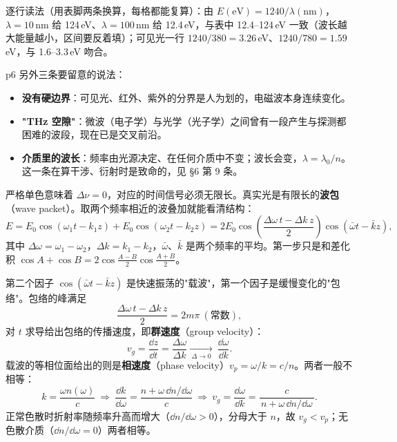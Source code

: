 \documentclass[10pt]{ctexart}
\begin{document}
逐行读法（用表脚两条换算，每格都能复算）：由 $E(\text{eV})=1240/\lambda(\text{nm})$，$\lambda=10$\,nm 给 124\,eV、$\lambda=100$\,nm 给 12.4\,eV，与表中 12.4--124\,eV 一致（波长越大能量越小，区间要反着填）；可见光一行 $1240/380=3.26$\,eV、$1240/780=1.59$\,eV，与 1.6--3.3\,eV 吻合。


p6 另外三条要留意的说法：
\begin{itemize}
\item \textbf{没有硬边界}：可见光、红外、紫外的分界是人为划的，电磁波本身连续变化。
\item \textbf{"THz 空隙"}：微波（电子学）与光学（光子学）之间曾有一段产生与探测都困难的波段，现在已是交叉前沿。
\item \textbf{介质里的波长}：频率由光源决定、在任何介质中不变；波长会变，$\lambda=\lambda_0/n$。这一条在算干涉、衍射时是致命的，见 §6 第 9 条。
\end{itemize}



严格单色意味着 $\Delta\nu=0$，对应的时间信号必须无限长。真实光是有限长的\textbf{波包}（wave packet）。取两个频率相近的波叠加就能看清结构：
\[
E=E_0\cos(\omega_1t-k_1z)+E_0\cos(\omega_2t-k_2z)
=2E_0\cos\!\left(\frac{\Delta\omega\,t-\Delta k\,z}{2}\right)\cos(\bar\omega t-\bar k z),
\]
其中 $\Delta\omega=\omega_1-\omega_2$，$\Delta k=k_1-k_2$，$\bar\omega$、$\bar k$ 是两个频率的平均。第一步只是和差化积 $\cos A+\cos B=2\cos\frac{A-B}{2}\cos\frac{A+B}{2}$。

第二个因子 $\cos(\bar\omega t-\bar kz)$ 是快速振荡的"载波"，第一个因子是缓慢变化的"包络"。包络的峰满足
\[
\frac{\Delta\omega\,t-\Delta k\,z}{2}=2m\pi\ (\text{常数}),
\]
对 $t$ 求导给出包络的传播速度，即\textbf{群速度}（group velocity）：
\[
v_g=\frac{\dd z}{\dd t}=\frac{\Delta\omega}{\Delta k}
\xrightarrow[\ \Delta\to0\ ]{}\ \frac{\dd\omega}{\dd k}.
\]
载波的等相位面给出的则是\textbf{相速度}（phase velocity）$v_p=\omega/k=c/n$。两者一般不相等：
\[
k=\frac{\omega n(\omega)}{c}
\ \Longrightarrow\
\frac{\dd k}{\dd\omega}=\frac{n+\omega\,\dd n/\dd\omega}{c}
\ \Longrightarrow\
v_g=\frac{\dd\omega}{\dd k}=\frac{c}{\,n+\omega\,\dd n/\dd\omega\,}.
\]
正常色散时折射率随频率升高而增大（$\dd n/\dd\omega>0$），分母大于 $n$，故 $v_g<v_p$；无色散介质（$\dd n/\dd\omega=0$）两者相等。
\end{document}

